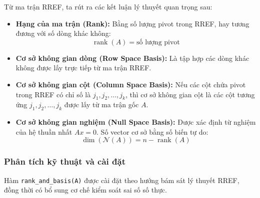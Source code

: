\documentclass[12pt,a4paper]{article}
\begin{document}
Từ ma trận RREF, ta rút ra các kết luận lý thuyết quan trọng sau:
\begin{itemize}[leftmargin=1.5em]
    \item \textbf{Hạng của ma trận (Rank):} Bằng số lượng pivot trong RREF, hay tương đương với số dòng khác không:
    \begin{equation}
    \operatorname{rank}(A) = \text{số lượng pivot}
    \end{equation}

    \item \textbf{Cơ sở không gian dòng (Row Space Basis):} Là tập hợp các dòng khác không được lấy trực tiếp từ ma trận RREF.

    \item \textbf{Cơ sở không gian cột (Column Space Basis):} Nếu các cột chứa pivot trong RREF có chỉ số là $j_1, j_2, \dots, j_k$, thì cơ sở không gian cột là các cột tương ứng $j_1, j_2, \dots, j_k$ được lấy từ ma trận gốc $A$.

    \item \textbf{Cơ sở không gian nghiệm (Null Space Basis):} Được xác định từ nghiệm của hệ thuần nhất $Ax = 0$. Số vector cơ sở bằng số biến tự do:
    \begin{equation}
    \dim(\mathcal{N}(A)) = n - \operatorname{rank}(A)
    \end{equation}
\end{itemize}

\subsubsection{Phân tích kỹ thuật và cài đặt}
Hàm \texttt{rank\_and\_basis(A)} được cài đặt theo hướng bám sát lý thuyết RREF, đồng thời có bổ sung cơ chế kiểm soát sai số số thực.
\end{document}
